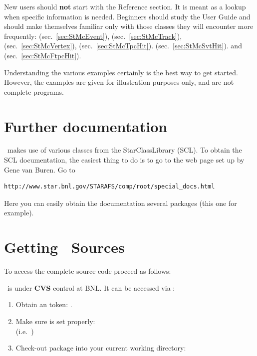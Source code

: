 New users should \textbf{not} start with the Reference section. It is
meant as a lookup when specific information is needed. Beginners
should study the User Guide and should make themselves familiar only
with those classes they will encounter more frequently:
  (sec.~\ref{sec:StMcEvent}),
  (sec.~\ref{sec:StMcTrack}),
 (sec.~\ref{sec:StMcVertex}),
 (sec.~\ref{sec:StMcTpcHit}).
 (sec.~\ref{sec:StMcSvtHit}).
and  (sec.~\ref{sec:StMcFtpcHit}).



Understanding the various
examples certainly is the best way to get started. However, the examples
are given for illustration purposes only, and are not complete programs.


\section{Further documentation}
\label{sec:furtherdoc}

\StMcEvent\ makes use of various classes from the StarClassLibrary (SCL).
To obtain the SCL documentation, the easiest thing to do is to go to
the web page set up by Gene van Buren. 
Go to
\begin{verbatim}
http://www.star.bnl.gov/STARAFS/comp/root/special_docs.html
\end{verbatim}
Here you can easily obtain the documentation several packages
(this one for example).
 


\section{Getting \StMcEvent\ Sources}  

To access the complete source code proceed as follows:

\StMcEvent\ is under {\bf CVS} control at BNL.  It can
be accessed via :   
\begin{enumerate}
  \item Obtain an  token: .
  \item Make sure  is set properly:\\ %
    (i.e.~)
  \item Check-out package into your current working directory:\\
\end{enumerate}

